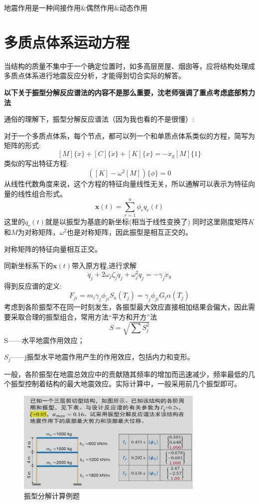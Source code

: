 \documentclass[12pt, a4paper, oneside, UTF8]{ctexbook}
\begin{document}
\begin{remark}
    地震作用是一种间接作用\&偶然作用\&动态作用
\end{remark}

\section{多质点体系运动方程}
当结构的质量不集中于一个确定位置时，如多高层房屋、烟囱等，应将结构处理成多质点体系进行地震反应分析，才能得到切合实际的解答。

\textbf{以下关于振型分解反应谱法的内容不是那么重要，沈老师强调了重点考虑底部剪力法}

通俗的理解下，振型分解反应谱法（因为我也看的不是很懂）:

对于一个多质点体系，每个节点，都可以列一个和单质点体系类似的方程，简写为矩阵的形式:
\[[M] \{ \ddot{x} \} + [C] \{ \dot{x} \} + [K] \{ x \} = - \ddot{x}_g [M] \{ 1 \}\]
类似的写出特征方程:
\[([K] - \omega^2 [M]) \{\phi\} = 0\]
从线性代数角度来说，这个方程的特征向量线性无关，所以通解可以表示为特征向量的线性组合形式。
\[\mathbf{x}(t) = \sum_{r=1}^{n} \phi_r q_r(t)\]
这里的$q_r(t)$就是以振型为基底的新坐标(相当于线性变换了)
同时这里刚度矩阵$K$和$M$为对称矩阵，$\omega^2$也是对称矩阵，因此振型是相互正交的。
\begin{remark}
    对称矩阵的特征向量相互正交。

\end{remark}
同新坐标系下的$\mathbf{x}(t)$带入原方程,进行求解
\[
\ddot{q}_j + 2\omega_j \zeta_j \dot{q}_j + \omega_j^2 q_j = -\gamma_j \ddot{x}_g
\]
得到反应谱的定义:
$$F_{ji} = m_i \gamma_j \phi_{ji} S_a(T_j) = \gamma_j \phi_{ji} G_i \alpha(T_j)$$
考虑到各阶振型不在同一时刻发生，各振型最大效应直接相加结果会偏大，因此需要采取合理的振型组合，常用方法“平方和开方”法
$$S = \sqrt{\sum S_j^2}$$
S——水平地震作用效应；

$S_j$——j振型水平地震作用产生的作用效应，包括内力和变形。

一般，各阶振型在地震总效应中的贡献随其频率的增加而迅速减少，频率最低的几个振型控制着结构的最大地震效应。实际计算中，一般采用前几个振型即可。

\begin{figure}[H]
    \centering
    \includegraphics[width=0.8\textwidth]{../figure/zhengxingfenjie.png}
    \caption{振型分解计算例题}
\end{figure}
\end{document}
